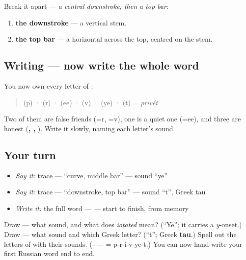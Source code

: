 Break it apart — \emph{a central downstroke, then a top bar}:

\begin{enumerate}
\raggedright
  \item \textbf{the downstroke} — a vertical stem.
  \item \textbf{the top bar} — a horizontal across the top, centred on the stem.
\end{enumerate}

\subsection*{Writing — now write the whole word}

You now own every letter of \textbf{}:

\begin{quote}
\textbf{} (p) · \textbf{} (r) · \textbf{} (ee) · \textbf{} (v) · \textbf{} (ye) · \textbf{} (t) = \emph{privét}
\end{quote}

Two of them are false friends (\textbf{}=r, \textbf{}=v), one is a quiet one (\textbf{}=ee), and three are honest (\textbf{, , }). Write it slowly, naming each letter's sound.

\subsection*{Your turn}
\begin{itemize}
\raggedright
  \item \emph{Say it:} trace  — \textquotedblleft{}curve, middle bar\textquotedblright{} — sound \textquotedblleft{}ye\textquotedblright{}
  \item \emph{Say it:} trace  — \textquotedblleft{}downstroke, top bar\textquotedblright{} — sound \textquotedblleft{}t\textquotedblright{}, Greek tau
  \item \emph{Write it:} the full word — \emph{} — start to finish, from memory
\end{itemize}

\begin{tcolorbox}[breakable,colback=teal!4,colframe=teal!35!black,title={Before you move on}]
Draw \textbf{} — what sound, and what does \emph{iotated} mean? (\textquotedblleft{}Ye\textquotedblright{}; it carries a \emph{y}-onset.) Draw \textbf{} — what sound and which Greek letter? (\textquotedblleft{}t\textquotedblright{}; Greek \textbf{tau}.) Spell out the letters of \emph{} with their sounds. (----- = p-r-i-v-ye-t.) You can now hand-write your first Russian word end to end.
\end{tcolorbox}
